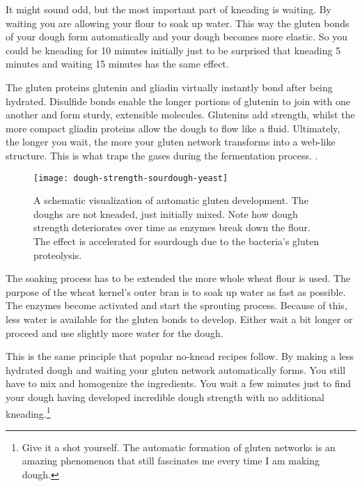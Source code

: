 It might sound odd, but the most important part of kneading is waiting. By
waiting you are allowing your flour to soak up water. This way the gluten
bonds of your dough form automatically and your dough becomes more elastic.
So you could be kneading for 10 minutes initially just to be surprised
that kneading 5 minutes and waiting 15 minutes has the same effect.

The gluten proteins glutenin and gliadin virtually instantly bond after being
hydrated. Disulfide bonds enable the longer portions of
glutenin to join with one another and form sturdy, extensible molecules.
Glutenins add strength, whilst the more compact gliadin proteins allow
the dough to flow like a fluid. Ultimately, the longer you wait, the more
your gluten network transforms into a web-like structure. This is what
traps the gases during the fermentation process. \cite{how+does+gluten+work}.

\begin{figure}[!htb]
  \texttt{[image: dough-strength-sourdough-yeast]}
  \caption{A schematic visualization of
  automatic gluten development. The doughs are not kneaded, just initially
  mixed. Note how dough strength
  deteriorates over time as enzymes break down the flour. The effect
  is accelerated for sourdough due to the bacteria's gluten proteolysis.
  }
  \label{fig:wheat-yeast-sourdough-degradation}
\end{figure}

The soaking process has to be extended the more whole wheat flour is used.
The purpose of the wheat kernel's outer bran is to soak up water as fast
as possible. The enzymes become activated and start the sprouting process.
Because of this, less water is available for the gluten bonds to develop.
Either wait a bit longer or proceed and use slightly more water for
the dough.

This is the same principle that popular no-knead recipes follow. By making a less
hydrated dough and waiting your gluten network automatically forms. You still
have to mix and homogenize the ingredients. You wait a few minutes just to
find your dough having developed incredible dough strength with no additional
kneading.\footnote{Give it a shot yourself. The automatic formation of gluten
networks is an amazing phenomenon that still fascinates me every time I am
making dough.}

